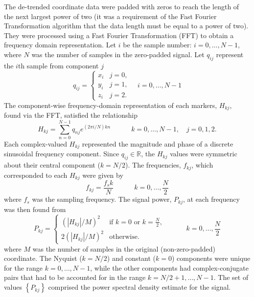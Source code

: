 \documentclass[
  a4paper,
  11pt,
  twoside,
  toc=flat,
  listof=flat
]{scrbook}
\begin{document}
The de-trended coordinate data were padded with zeros to reach the length of the next largest power of two (it was a requirement of the Fast Fourier Transformation algorithm that the data length must be equal to a power of two).  They were processed using a Fast Fourier Transformation (FFT) to obtain a frequency domain representation.  Let $i$ be the sample number: $i = 0, \ldots, N-1$, where $N$ was the number of samples in the zero-padded signal.  Let $q_{ij}$ represent the $i$th sample from component $j$
\begin{equation}
q_{ij} = \begin{cases}
x_i & j=0, \\
y_i & j=1, \\
z_i & j=2.
\end{cases} \hspace{1em} i = 0, \ldots, N-1
\end{equation}
The component-wise frequency-domain representation of each markers, $H_{kj}$, found via the FFT, satisfied the relationship
\begin{equation}
H_{kj} = \sum_{n=0}^{N-1} q_{nj} e^{(2\pi i/N)kn} \hspace{3em} k = 0, \ldots, N-1, \hspace{1em} j = 0, 1, 2.
\label{eq:dft}
\end{equation}
Each complex-valued $H_{kj}$ represented the magnitude and phase of a discrete sinusoidal frequency component.  Since $q_{ij} \in \mathbb{R}$, the $H_{kj}$ values were symmetric about their central component ($k = N/2$).  The frequencies, $f_{kj}$, which corresponded to each $H_{kj}$ were given by
\begin{equation}
f_{kj} = \frac{f_s k}{N} \hspace{3em} k = 0, \ldots, \frac{N}{2}
\end{equation}
where $f_s$ was the sampling frequency.  The signal power, $P_{kj}$, at each frequency was then found from
\begin{equation}
P_{kj} = \begin{cases}
\left(\left| H_{kj} \right| / M \right)^2 & \text{if $k=0$ or $k=\frac{N}{2}$},\\
2\left(\left| H_{kj} \right| / M \right)^2 & \text{otherwise.}
\end{cases} \hspace{3em} k = 0,\ldots,\frac{N}{2}
\end{equation}
where $M$ was the number of samples in the original (non-zero-padded) coordinate.  The Nyquist ($k=N/2$) and constant ($k=0$) components were unique for the range $k=0,\ldots,N-1$, while the other components had complex-conjugate pairs that had to be accounted for in the range $k=N/2+1,\ldots,N-1$.  The set of values $\left\{ P_{kj} \right\}$ comprised the power spectral density estimate for the signal.
\end{document}
